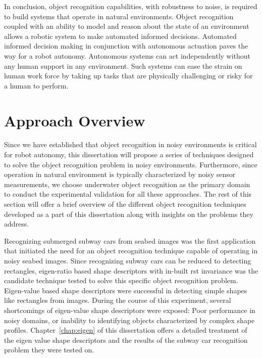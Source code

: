 In conclusion, object recognition capabilities, with robustness to noise, is required to build systems that operate in natural environments. Object recognition coupled with an ability to model and reason about the state of an environment allows a robotic system to make automated informed decisions. Automated informed decision making in conjunction with autonomous actuation paves the way for a robot autonomy. Autonomous systems can act independently without any human support in any environment. Such systems can ease the strain on human work force by taking up tasks that are physically challenging or risky for a human to perform.

\section{Approach Overview}

Since we have established that object recognition in noisy environments is critical for robot autonomy, this dissertation will propose a series of techniques designed to solve the object recognition problem in noisy environments.
Furthermore, since operation in natural environment is typically characterized by noisy sensor measurements, we choose
underwater object recognition as the primary domain to conduct the experimental validation for all these approaches.
The rest of this section will offer a brief overview of the different object recognition techniques developed as a part of this dissertation along with insights on the problems they address.

Recognizing submerged subway cars from seabed images was the first application that initiated the need for 
an object recognition technique capable of operating in noisy seabed images. Since recognizing subway cars can be reduced 
to detecting rectangles, eigen-ratio based shape descriptors with in-built \gls{rst} invariance was the candidate technique tested
to solve this specific object recognition problem. Eigen-value based shape descriptors were successful in detecting 
simple shapes like rectangles from images.
During the course of this experiment, several shortcomings of eigen-value shape descriptors were exposed: Poor performance in noisy domains, or inability to identifying objects characterized by complex shape profiles. Chapter~\ref{chap:eigen} of this dissertation offers a detailed treatment of the eigen value shape descriptors and the results of the subway car recognition problem they were tested on.

